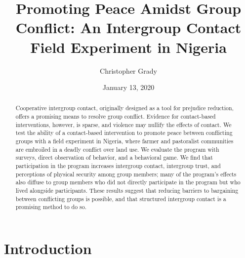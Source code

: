 \documentclass[11pt]{article}
\title{Promoting Peace Amidst Group Conflict: An Intergroup Contact Field
Experiment in Nigeria}
\author{
Christopher Grady
}
\date{January 13, 2020}
\begin{document}
\VerbatimFootnotes

%
%
%
%
%
%
%
%
%
%

\maketitle

\begin{abstract}

Cooperative intergroup contact, originally designed as a tool for prejudice reduction, offers a promising means to resolve group conflict.  Evidence for contact-based interventions, however, is sparse, and violence may nullify the effects of contact.  We test the ability of a contact-based intervention to promote peace between conflicting groups with a field experiment in Nigeria, where farmer and pastoralist communities are embroiled in a deadly conflict over land use.  We evaluate the program with surveys, direct observation of behavior, and a behavioral game.  We find that participation in the program increases intergroup contact, intergroup trust, and perceptions of physical security among group members; many of the program's effects also diffuse to group members who did not directly participate in the program but who lived alongside participants.  These results suggest that reducing barriers to bargaining between conflicting groups is possible, and that structured intergroup contact is a promising method to do so.

\end{abstract}

\hypertarget{introduction}{%
\section{Introduction}\label{introduction}}
\end{document}
